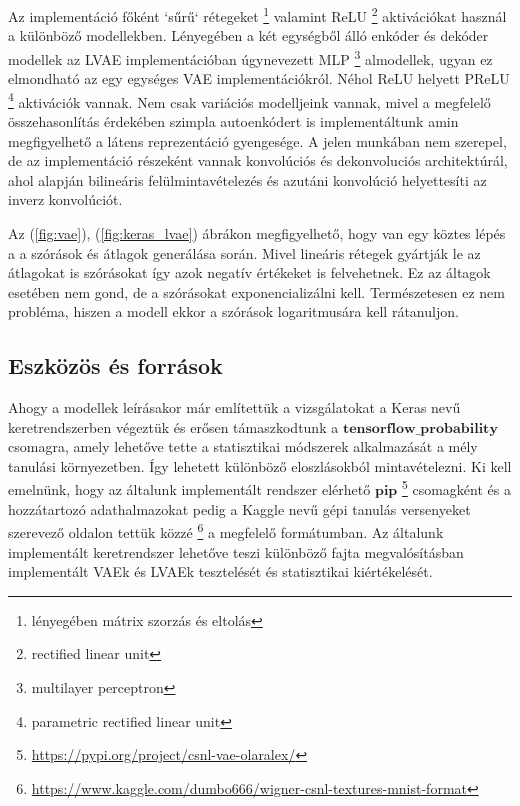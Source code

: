 \documentclass[12pt, english]{article}
\begin{document}
\vspace{4mm}

\par Az implementáció főként `sűrű` rétegeket \footnote{lényegében mátrix szorzás és eltolás} valamint ReLU \footnote{rectified linear unit} aktivációkat használ a különböző modellekben. Lényegében a két egységből álló enkóder és dekóder modellek az LVAE implementációban úgynevezett MLP \footnote{multilayer perceptron} almodellek, ugyan ez elmondható az egy egységes VAE implementációkról. Néhol ReLU helyett PReLU \footnote{parametric rectified linear unit} aktivációk vannak. Nem csak variációs modelljeink vannak, mivel a megfelelő összehasonlítás érdekében szimpla autoenkódert is implementáltunk amin megfigyelhető a látens reprezentáció gyengesége. A jelen munkában nem szerepel, de az implementáció részeként vannak konvolúciós és dekonvoluciós architektúrál, ahol \cite{odena2016deconvolution} alapján bilineáris felülmintavételezés és azutáni konvolúció helyettesíti az inverz konvolúciót. 

\vspace{4mm}

\par Az (\ref{fig:vae}), (\ref{fig:keras_lvae}) ábrákon megfigyelhető, hogy van egy köztes lépés a a szórások és átlagok generálása során. Mivel lineáris rétegek gyártják le az átlagokat is szórásokat így azok negatív értékeket is felvehetnek. Ez az áltagok esetében nem gond, de a szórásokat exponencializálni kell. Természetesen ez nem probléma, hiszen a modell ekkor a szórások logaritmusára kell rátanuljon.

\vspace{5mm}

\subsection{Eszközös és források}

\vspace{5mm}

\par Ahogy a modellek leírásakor már említettük a vizsgálatokat a Keras nevű keretrendszerben végeztük és erősen támaszkodtunk a $\bm{tensorflow\_probability}$  csomagra, amely lehetőve tette a statisztikai módszerek alkalmazását a mély tanulási környezetben. Így lehetett különböző eloszlásokból mintavételezni. Ki kell emelnünk, hogy az általunk implementált rendszer elérhető $\bm{pip}$ \footnote{\url{https://pypi.org/project/csnl-vae-olaralex/}} csomagként és a hozzátartozó adathalmazokat pedig a Kaggle nevű gépi tanulás versenyeket szerevező oldalon tettük közzé \footnote{\url{https://www.kaggle.com/dumbo666/wigner-csnl-textures-mnist-format}} a megfelelő formátumban. Az általunk implementált keretrendszer lehetőve teszi különböző fajta megvalósításban implementált VAEk és LVAEk tesztelését és statisztikai kiértékelését.
\end{document}
